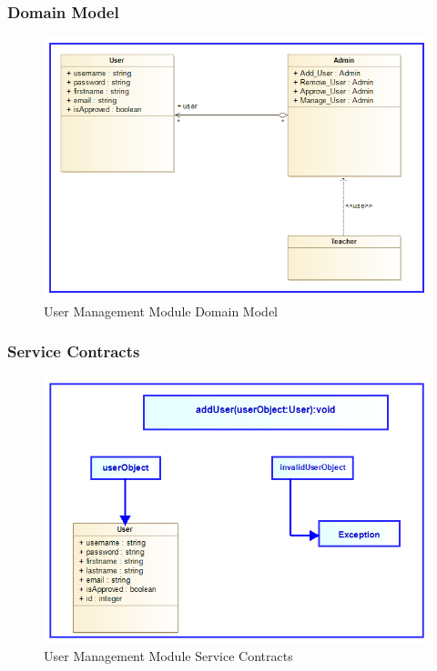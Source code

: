 \documentclass{article}
\begin{document}
		\subsubsection{Domain Model}
						\begin{figure}[h]
					\includegraphics[scale=0.6]{Images/User_Management_Module/UserManagementModuleDomainModel}
					\caption{User Management Module Domain Model}
				\end{figure}
				
		\subsubsection{Service Contracts}
						\begin{figure}[h]
					\includegraphics[scale=0.6]{Images/User_Management_Module/UserManagementModuleServiceContracts}
					\caption{User Management Module Service Contracts}
				\end{figure}
				
\end{document}
